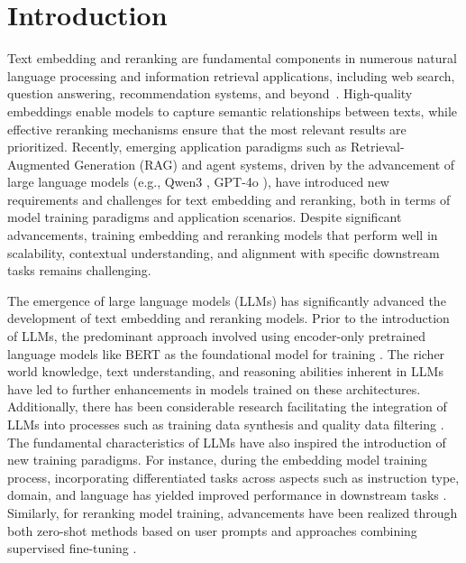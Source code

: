 \section{Introduction}
\label{sec:intro}
Text embedding and reranking are fundamental components in numerous natural language processing and information retrieval applications, including web search, question answering, recommendation systems, and beyond~\citep{karpukhin2020dense,huang2020embedding,zhao2023embedding,zhao2024dense}. High-quality embeddings enable models to capture semantic relationships between texts, while effective reranking mechanisms ensure that the most relevant results are prioritized. Recently, emerging application paradigms such as Retrieval-Augmented Generation (RAG) and agent systems, driven by the advancement of large language models (e.g., Qwen3 \citep{yang2025qwen3}, GPT-4o \citep{hurst2024gpt}), have introduced new requirements and challenges for text embedding and reranking, both in terms of model training paradigms and application scenarios. Despite significant advancements, training embedding and reranking models that perform well in scalability, contextual understanding, and alignment with specific downstream tasks remains challenging.

The emergence of large language models (LLMs) has significantly advanced the development of text embedding and reranking models. Prior to the introduction of LLMs, the predominant approach involved using encoder-only pretrained language models like BERT as the foundational model for training \citep{reimers-gurevych-2019-sentence}. The richer world knowledge, text understanding, and reasoning abilities inherent in LLMs have led to further enhancements in models trained on these architectures. Additionally, there has been considerable research facilitating the integration of LLMs into processes such as training data synthesis and quality data filtering \citep{wang-etal-2024-improving-text,lee2024nv,lee2025gemini}. The fundamental characteristics of LLMs have also inspired the introduction of new training paradigms. For instance, during the embedding model training process, incorporating differentiated tasks across aspects such as instruction type, domain, and language has yielded improved performance in downstream tasks \citep{su2023one}. Similarly, for reranking model training, advancements have been realized through both zero-shot methods based on user prompts and approaches combining supervised fine-tuning \citep{ma2023zero,pradeep2023rankvicuna,zhang2024two,zhuang2024setwise}.

